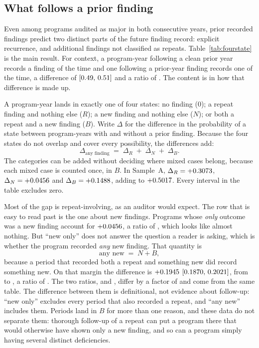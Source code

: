 \subsection{What follows a prior finding}

Even among programs audited as major in both consecutive years, prior recorded
findings predict two distinct parts of the future finding record: explicit
recurrence, and additional findings not classified as repeats. Table~\ref{tab:fourstate}
is the main result. For context, a program-year following a clean prior year
records a finding \mPAnyNoPrior{} of the time and one following a prior-year
finding records one \mPAnyPrior{} of the time, a difference of \mDAny{}
$[0.49{},\,0.51{}]$ and a ratio of \nRRAny{}. The content is in
how that difference is made up.

A program-year lands in exactly one of four states: no finding ($0$); a repeat
finding and nothing else ($R$); a new finding and nothing else ($N$); or both
a repeat and a new finding ($B$). Write $\Delta$ for the difference in the
probability of a state between program-years with and without a prior
finding. Because the four states do not overlap and cover every possibility,
the differences add:
%
\begin{equation}\label{eq:four}
  \Delta_{\text{any finding}}
  \;=\;
  \Delta_{R}
  \;+\;
  \Delta_{N}
  \;+\;
  \Delta_{B} .
\end{equation}
%
The categories can be added without deciding where mixed cases belong,
because each mixed case is counted once, in $B$. In Sample~A, $\Delta_R =
+0.3073{}$, $\Delta_N = +0.0456{}$ and $\Delta_B = +0.1488{}$, adding to
$+0.5017{}$. Every interval in the table excludes zero.

Most of the gap is repeat-involving, as an auditor would expect. The row that
is easy to read past is the one about new findings. Programs whose \emph{only}
outcome was a new finding account for $+0.0456{}$, a ratio of \nRRNonly{},
which looks like almost nothing. But ``new only'' does not answer the
question a reader is asking, which is whether the program recorded \emph{any}
new finding. That quantity is
%
\[
  \text{any new} \;=\; N + B ,
\]
%
because a period that recorded both a repeat and something new did record
something new. On that margin the difference is $+0.1945{}$
$[0.1870{},\,0.2021{}]$, from \mPAnyNewNoPrior{} to
\mPAnyNewPrior{}, a ratio of \nRRAnyNew{}. The two ratios, \nRRNonly{} and
\nRRAnyNew{}, differ by a factor of \nRRfactor{} and come from the same table.
The difference between them is definitional, not evidence about follow-up:
``new only'' excludes every period that also recorded a repeat, and ``any
new'' includes them. Periods land in $B$ for more than one reason, and these
data do not separate them: thorough follow-up of a repeat can put a program
there that would otherwise have shown only a new finding, and so can a program
simply having several distinct deficiencies.

